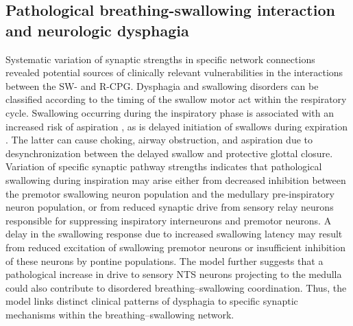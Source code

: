 \documentclass[pdflatex,sn-mathphys-ay]{sn-jnl}%
\theoremstyle{thmstyleone}%
\theoremstyle{thmstyletwo}%
\theoremstyle{thmstylethree}%
\begin{document}
\subsection{Pathological breathing-swallowing interaction and neurologic dysphagia}
Systematic variation of synaptic strengths in specific network connections revealed potential sources of clinically relevant vulnerabilities in the interactions between the SW- and R-CPG. Dysphagia and swallowing disorders can be classified according to the timing of the swallow motor act within the respiratory cycle. Swallowing occurring during the inspiratory phase is associated with an increased risk of aspiration \citep{yagi2017inappropriate, mccarty2021dysphagia}, as is delayed initiation of swallows during expiration \citep{yagi2017inappropriate, mccarty2021dysphagia}. The latter can cause choking, airway obstruction, and aspiration due to desynchronization between the delayed swallow and protective glottal closure.
Variation of specific synaptic pathway strengths indicates that pathological swallowing during inspiration may arise either from decreased inhibition between the premotor swallowing neuron population and the medullary pre-inspiratory neuron population, or from reduced synaptic drive from sensory relay neurons responsible for suppressing inspiratory interneurons and premotor neurons.
A delay in the swallowing response due to increased swallowing latency may result from reduced excitation of swallowing premotor neurons or insufficient inhibition of these neurons by pontine populations. The model further suggests that a pathological increase in drive to sensory NTS neurons projecting to the medulla could also contribute to disordered breathing–swallowing coordination.
Thus, the model links distinct clinical patterns of dysphagia to specific synaptic mechanisms within the breathing–swallowing network.
\end{document}
